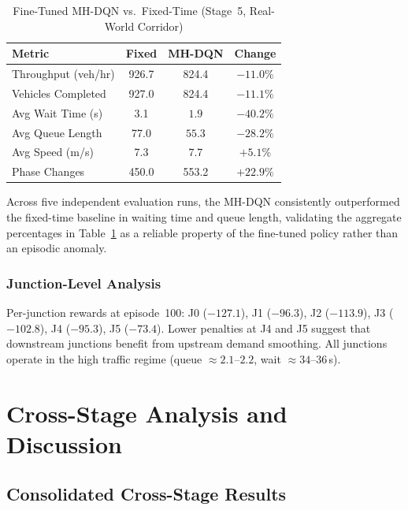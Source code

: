 \documentclass[lettersize,journal]{IEEEtran}
\begin{document}
\begin{table}[!t]
\caption{Fine-Tuned MH-DQN vs.\ Fixed-Time
         (Stage~5, Real-World Corridor)\label{tab:results_hab}}
\centering
\renewcommand{\arraystretch}{1.2}
\begin{tabular}{@{}lccc@{}}
\toprule
\textbf{Metric} & \textbf{Fixed} & \textbf{MH-DQN} & \textbf{Change} \\
\midrule
Throughput (veh/hr) & 926.7 & 824.4           & $-11.0\%$ \\
Vehicles Completed  & 927.0 & 824.4           & $-11.1\%$ \\
Avg Wait Time (s)   & 3.1   & $\mathbf{1.9}$  & $\mathbf{-40.2\%}$ \\
Avg Queue Length    & 77.0  & $\mathbf{55.3}$ & $\mathbf{-28.2\%}$ \\
Avg Speed (m/s)     & 7.3   & $\mathbf{7.7}$  & $\mathbf{+5.1\%}$ \\
Phase Changes       & 450.0 & 553.2           & $+22.9\%$ \\
\bottomrule
\end{tabular}
\end{table}

Across five independent evaluation runs, the MH-DQN consistently outperformed the fixed-time baseline in waiting time and queue length, validating the aggregate percentages in Table~\ref{tab:results_hab} as a reliable property of the fine-tuned policy rather than an episodic anomaly.

\subsubsection{Junction-Level Analysis}

Per-junction rewards at episode~100: J0 ($-127.1$), J1 ($-96.3$), J2
($-113.9$), J3 ($-102.8$), J4 ($-95.3$), J5 ($-73.4$). Lower penalties at
J4 and J5 suggest that downstream junctions benefit from upstream demand
smoothing. All junctions operate in the high traffic regime
(queue $\approx 2.1$--$2.2$, wait $\approx 34$--$36$\,s).

\section{Cross-Stage Analysis and Discussion}
\label{sec:discussion}

\subsection{Consolidated Cross-Stage Results}
\end{document}
